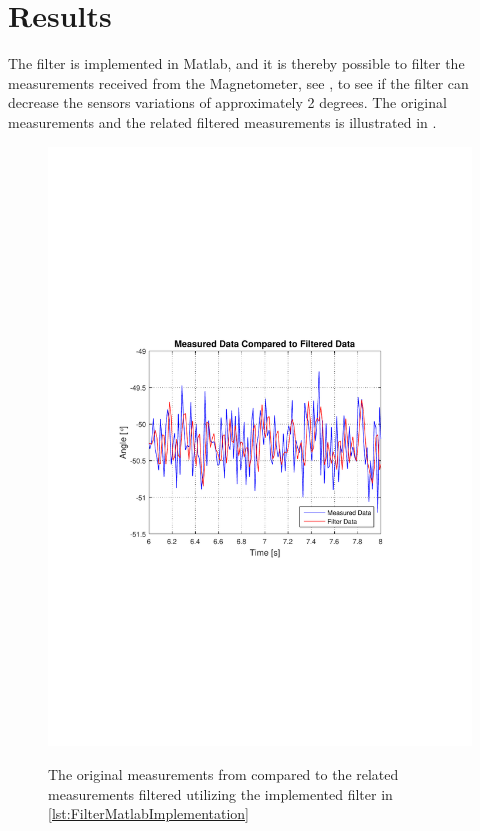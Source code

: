 \section{Results}
The filter is implemented in Matlab, and it is thereby possible to filter the measurements received from the Magnetometer, see , to see if the filter can decrease the sensors variations of approximately 2 degrees. The original measurements and the related filtered measurements is illustrated in .
%
\begin{figure}[H]
  \centering
  {
    \includegraphics[width=1.2\textwidth]{figures/FinalImplementedFilter.pdf}
  }
  \caption{The original measurements from  compared to the related measurements filtered utilizing the implemented filter in \autoref{lst:FilterMatlabImplementation}}
  \label{fig:FinalImplementedFilter}
\end{figure}

